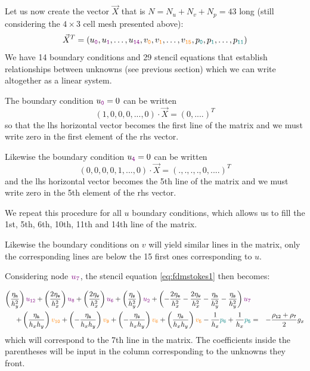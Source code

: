 Let us now create the vector $\vec{X}$ that is $N=N_u+N_v+N_p=43$ long (still considering 
the $4\times 3$ cell mesh presented above):
\[
\vec{X}^T=(
u_{\tt \color{violet} 0},u_{\tt \color{violet} 1}, \dots , u_{\tt \color{violet} 14},
v_{\tt \color{orange} 0},v_{\tt \color{orange} 1}, \dots , v_{\tt \color{orange} 15},
p_{\tt \color{teal} 0},p_{\tt \color{teal} 1}, \dots, p_{\tt \color{teal} 11})
\]
We have 14 boundary conditions and 29 stencil equations that establish relationships between 
unknowns  (see previous section) which we can write altogether as a linear system.

The boundary condition $u_{\color{violet} \tt 0}=0$ can be written 
\[
(1,0,0,0,...,0) \cdot \vec{X} = (0,....)^T
\]
so that the lhs horizontal vector becomes the first line of the matrix and we
must write zero in the first element of the rhs vector. 

Likewise the boundary condition $u_{\color{violet} \tt 4}=0$ can be written
\[
(0,0,0,0,1,...,0) \cdot \vec{X} = (.,.,.,.,0,....)^T
\]
and the lhs horizontal vector becomes the 5th line of the matrix and we
must write zero in the 5th element of the rhs vector. 

We repeat this procedure for all $u$ boundary conditions, which allows us to fill 
the 1st, 5th, 6th, 10th, 11th and 14th line of the matrix.

Likewise the boundary conditions on $v$ will yield similar lines in the matrix, 
only the corresponding lines are below the 15 first ones corresponding to $u$.

Considering node ${\color{violet} u_7}$, the stencil equation \eqref{eq:fdmstokes1} then becomes:



\begin{eqnarray}
\left( \frac{\eta_{\tt n}}{h_y^2} \right) {\color{violet} u_{\tt 12}} + 
\left( \frac{2\eta_{\tt e}}{h_x^2} \right) {\color{violet} u_{\tt 8}} + 
\left( \frac{2\eta_{\tt w}}{h_x^2} \right) {\color{violet} u_{\tt 6}} + 
\left( \frac{\eta_{\tt s}}{h_y^2} \right) {\color{violet} u_{\tt 2}} + 
\left( -\frac{2\eta_{\tt e}}{h_x^2} -\frac{2\eta_{\tt w}}{h_x^2}  
-\frac{\eta_{\tt n}}{h_y^2} -\frac{\eta_{\tt s}}{h_y^2}  
\right) {\color{violet} u_7} \nonumber\\
+
\left( \frac{\eta_{\tt n}}{h_x h_y} \right) {\color{orange} v_{\tt 10}}+ 
\left(-\frac{\eta_{\tt n}}{h_x h_y} \right) {\color{orange} v_{\tt 9}}+ 
\left(-\frac{\eta_{\tt s}}{h_x h_y} \right) {\color{orange} v_{\tt 6}}+ 
\left( \frac{\eta_{\tt s}}{h_x h_y} \right) {\color{orange} v_{\tt 5}} 
- \frac{1}{h_x} {\color{teal}p_{\tt 6}} + \frac{1}{h_x} {\color{teal}p_{\tt 5}} 
&=& -\frac{\rho_{\tt 12}+\rho_{\tt 7}}{2} g_x \nonumber
\end{eqnarray}
which will correspond to the 7th line in the matrix. The coefficients inside the 
parentheses will be input in the column corresponding to the unknowns they front. 



